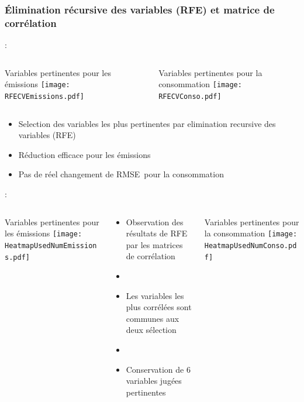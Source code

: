\documentclass[8pt,aspectratio=169,hyperref={unicode=true}]{beamer}
\begin{document}
\subsubsection{Élimination récursive des variables (RFE) et matrice de corrélation}
\begin{frame}{\insertsection : \insertsubsection}{\insertsubsubsection}
  \begin{columns}[t]
    \begin{column}{.5\textwidth}
      \centering
      Variables pertinentes pour les émissions
      \texttt{[image: RFECVEmissions.pdf]}
    \end{column}
    \begin{column}{.5\textwidth}
      \centering
      Variables pertinentes pour la consommation
      \texttt{[image: RFECVConso.pdf]}
    \end{column}
  \end{columns}
  \begin{itemize}
    \item Selection des variables les plus pertinentes par elimination recursive des variables (RFE)
    \item Réduction efficace pour les émissions
    \item Pas de réel changement de RMSE pour la consommation
  \end{itemize}
\end{frame}

\begin{frame}{\insertsection : \insertsubsection}{\insertsubsubsection}
  \begin{columns}[t]
    \begin{column}{.33\textwidth}
      \centering
      Variables pertinentes pour les émissions
      \texttt{[image: HeatmapUsedNumEmissions.pdf]}
    \end{column}
    \begin{column}{.33\textwidth}
      \begin{itemize}
        \item Observation des résultats de RFE par les matrices de corrélation
        \item[]
        \item Les variables les plus corrélées sont communes aux deux sélection
        \item[]
        \item Conservation de 6 variables jugées pertinentes
      \end{itemize}
    \end{column}
    \begin{column}{.33\textwidth}
      \centering
      Variables pertinentes pour la consommation
      \texttt{[image: HeatmapUsedNumConso.pdf]}
    \end{column}
  \end{columns}
\end{frame}
\end{document}

